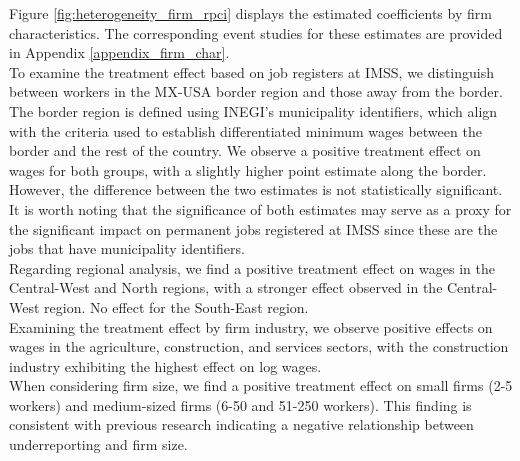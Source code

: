 \documentclass[10pt, oneside]{book}
\begin{document}
Figure \ref{fig:heterogeneity_firm_rpci} displays the estimated coefficients by firm characteristics. The corresponding event studies for these estimates are provided in Appendix \ref{appendix_firm_char}. \\

To examine the treatment effect based on job registers at IMSS, we distinguish between workers in the MX-USA border region and those away from the border. The border region is defined using INEGI's municipality identifiers, which align with the criteria used to establish differentiated minimum wages between the border and the rest of the country. We observe a positive treatment effect on wages for both groups, with a slightly higher point estimate along the border. However, the difference between the two estimates is not statistically significant. It is worth noting that the significance of both estimates may serve as a proxy for the significant impact on permanent jobs registered at IMSS since these are the jobs that have municipality identifiers. \\

Regarding regional analysis, we find a positive treatment effect on wages in the Central-West and North regions, with a stronger effect observed in the Central-West region. No effect for the South-East region. \\

Examining the treatment effect by firm industry, we observe positive effects on wages in the agriculture, construction, and services sectors, with the construction industry exhibiting the highest effect on log wages. \\

When considering firm size, we find a positive treatment effect on small firms (2-5 workers) and medium-sized firms (6-50 and 51-250 workers). This finding is consistent with previous research indicating a negative relationship between underreporting and firm size. \\
\end{document}
